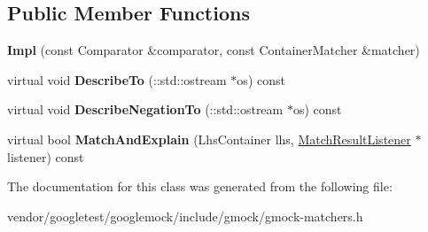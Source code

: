 \subsection*{Public Member Functions}
\begin{DoxyCompactItemize}
\item 
\mbox{\label{classtesting_1_1internal_1_1_when_sorted_by_matcher_1_1_impl_a63235e98dec5478b7ff9d06f6babc716}} 
{\bfseries Impl} (const Comparator \&comparator, const Container\+Matcher \&matcher)
\item 
\mbox{\label{classtesting_1_1internal_1_1_when_sorted_by_matcher_1_1_impl_a33f7b8bdce4adb02618e90ac2ec949f9}} 
virtual void {\bfseries Describe\+To} (\+::std\+::ostream $\ast$os) const
\item 
\mbox{\label{classtesting_1_1internal_1_1_when_sorted_by_matcher_1_1_impl_a0a59f77fdbb88a6326e5aba671f2aa3e}} 
virtual void {\bfseries Describe\+Negation\+To} (\+::std\+::ostream $\ast$os) const
\item 
\mbox{\label{classtesting_1_1internal_1_1_when_sorted_by_matcher_1_1_impl_a9d8f57c729df8c041f2fd7febbc950da}} 
virtual bool {\bfseries Match\+And\+Explain} (Lhs\+Container lhs, \hyperlink{classtesting_1_1_match_result_listener}{Match\+Result\+Listener} $\ast$listener) const
\end{DoxyCompactItemize}


The documentation for this class was generated from the following file\+:\begin{DoxyCompactItemize}
\item 
vendor/googletest/googlemock/include/gmock/gmock-\/matchers.\+h\end{DoxyCompactItemize}
